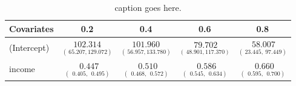 %
\begin{table}[hptb]
\begin{center}
\begin{tabular}{|l||c|c|c|c|} \hline
\multicolumn{1}{|l||}{Covariates}&\multicolumn{1}{c|}{0.2}&\multicolumn{1}{c|}{0.4}&\multicolumn{1}{c|}{0.6}&\multicolumn{1}{c|}{0.8}\\ \hline
(Intercept)&$\underset{(~65.207,129.072)}{102.314}$&$\underset{(~56.957,133.780)}{101.960}$&$\underset{(~48.901,117.370)}{~79.702}$&$\underset{(~23.445,~97.449)}{~58.007}$\\ 
income&$\underset{(~~0.405,~~0.495)}{~~0.447}$&$\underset{(~~0.468,~~0.572)}{~~0.510}$&$\underset{(~~0.545,~~0.634)}{~~0.586}$&$\underset{(~~0.595,~~0.700)}{~~0.660}$\\ 
\hline
\end{tabular}
\vspace{3mm}
\caption{caption goes here.\label{summary}} \caption{caption goes here.\label{fm}} 
\end{center}
\end{table}
